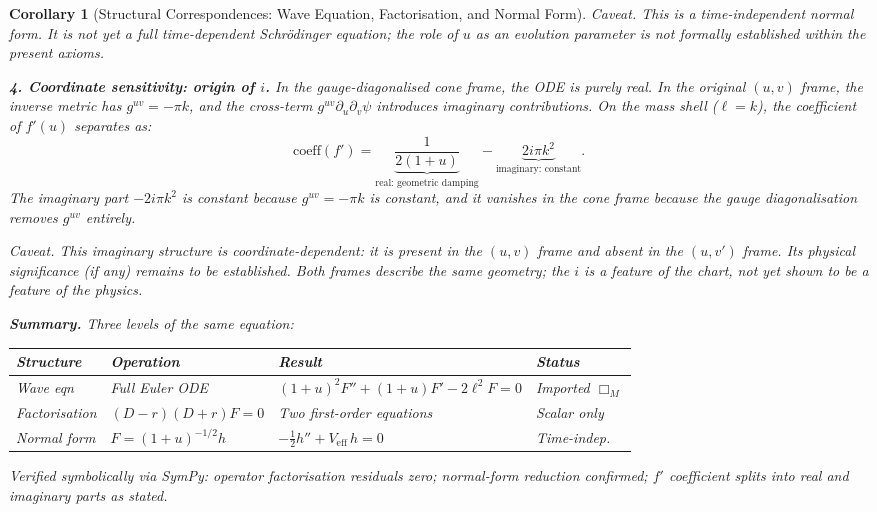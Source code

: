 \documentclass[12pt]{amsart}
\newtheorem{corollary}{Corollary}
\begin{document}
\begin{corollary}[Structural Correspondences: Wave Equation, Factorisation, and Normal Form]
\textit{Caveat.} This is a time-independent normal form. It is not yet a full time-dependent
Schr\"odinger equation; the role of $u$ as an evolution parameter is not formally established
within the present axioms.

\textbf{4. Coordinate sensitivity: origin of $i$.} In the gauge-diagonalised cone frame, the
ODE is purely real. In the original $(u,v)$ frame, the inverse metric has $g^{uv} = -\pi k$,
and the cross-term $g^{uv}\partial_u\partial_v\psi$ introduces imaginary contributions. On the
mass shell ($\ell = k$), the coefficient of $f'(u)$ separates as:
\[
  \mathrm{coeff}(f') = \underbrace{\frac{1}{2(1+u)}}_{\text{real: geometric damping}}
    - \underbrace{2i\pi k^2}_{\text{imaginary: constant}}.
\]
The imaginary part $-2i\pi k^2$ is constant because $g^{uv} = -\pi k$ is constant, and it
vanishes in the cone frame because the gauge diagonalisation removes $g^{uv}$ entirely.

\textit{Caveat.} This imaginary structure is coordinate-dependent: it is present in the
$(u,v)$ frame and absent in the $(u,v')$ frame. Its physical significance (if any) remains to
be established. Both frames describe the same geometry; the $i$ is a feature of the chart, not
yet shown to be a feature of the physics.

\medskip
\textbf{Summary.} Three levels of the same equation:

\begin{center}
\begin{tabular}{llll}
\hline
Structure & Operation & Result & Status \\
\hline
Wave eqn & Full Euler ODE &
  $(1+u)^2 F'' + (1+u)F' - 2\ell^2 F = 0$ & Imported $\Box_M$ \\
Factorisation & $(D-r)(D+r)F=0$ & Two first-order equations & Scalar only \\
Normal form & $F = (1+u)^{-1/2}h$ &
  $-\tfrac{1}{2}h'' + V_{\mathrm{eff}}\, h = 0$ & Time-indep. \\
\hline
\end{tabular}
\end{center}

Verified symbolically via SymPy: operator factorisation residuals zero; normal-form
reduction confirmed; $f'$ coefficient splits into real and imaginary parts as stated.
\end{corollary}

\end{document}
